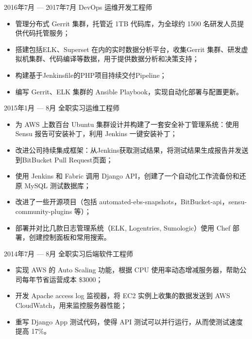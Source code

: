 \documentclass{resume}
\begin{document}
\begin{body}
	{2016年7月 --- 2017年7月}
	{DevOps 运维开发工程师}
	\begin{itemize}[noitemsep,topsep=0pt]
		\item 管理分布式 Gerrit 集群，托管近 1TB 代码库，为全球约 1500 名研发人员提供代码托管服务；
		\item 搭建包括ELK、Superset 在内的实时数据分析平台，收集Gerrit 集群、研发虚拟机集群、代码编译等数据，用于提供数据分析和决策支持；
		\item 构建基于Jenkinsfile的PHP项目持续交付Pipeline；
		\item 编写 Gerrit、ELK 集群的 Ansible Playbook，实现自动化部署与配置更新。
	\end{itemize}
\end{body}

\begin{body}
	{2015年1月 --- 8月}
	{全职实习运维工程师}
	\begin{itemize}[noitemsep,topsep=0pt]
		\item 为 AWS 上数百台 Ubuntu 集群设计并构建了一套安全补丁管理系统：使用 Sensu 报告可安装补丁，利用 Jenkins 一键安装补丁；
		\item 改进公司持续集成框架：从Jenkins获取测试结果，将测试结果生成报告并发送到BitBucket Pull Request页面；
		\item 使用 Jenkins 和 Fabric 调用 Django API，创建了一个自动化工作流备份和还原 MySQL 测试数据库；
		\item 改进了一些开源项目（包括 automated-ebs-snapshots，BitBucket-api，sensu-community-plugins 等）；
		\item 部署并对比几款日志管理系统（ELK, Logentries, Sumologic）使用 Chef 部署，创建控制面板和常用搜索。
	\end{itemize}
\end{body}

\begin{body}
	{2014年7月 --- 8月}
	{全职实习后端软件工程师}
	\begin{itemize}[noitemsep,topsep=0pt]
		\item 实现 AWS 的 Auto Scaling 功能，根据 CPU 使用率动态增减服务器，帮助公司每年节省运营成本 \$3000；
		\item 开发 Apache access log 监视器，将 EC2 实例上收集的数据发送到 AWS CloudWatch，用来监控服务器性能；
		\item 重写 Django App 测试代码，使得 API 测试可以并行运行，从而使测试速度提高 17\%。
	\end{itemize}
\end{body}
\end{document}
